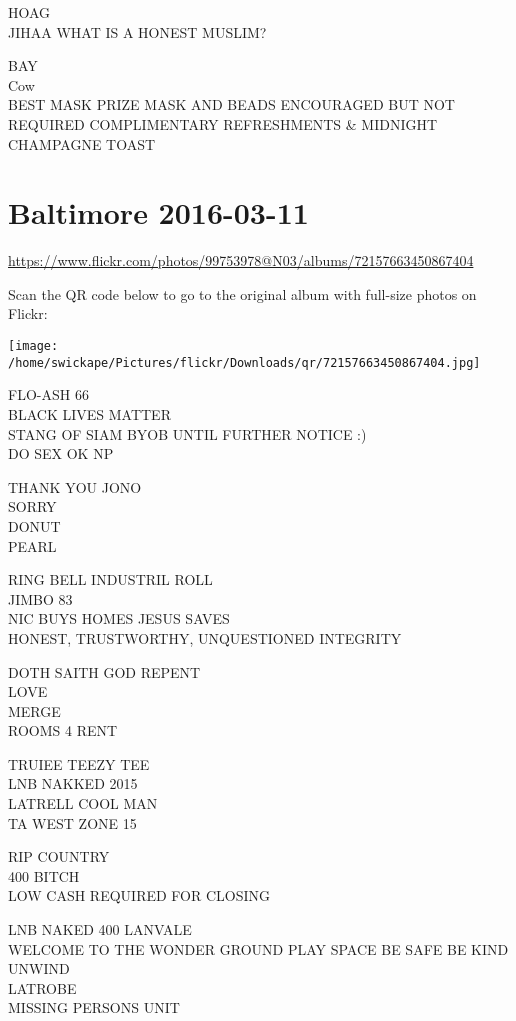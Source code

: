 \documentclass[10pt,letterpaper]{article}
\begin{document}
HOAG\\
JIHAA WHAT IS A HONEST MUSLIM?

BAY\\
Cow\\
BEST MASK PRIZE MASK AND BEADS ENCOURAGED BUT NOT REQUIRED COMPLIMENTARY REFRESHMENTS \& MIDNIGHT CHAMPAGNE TOAST


\section*{Baltimore 2016-03-11}

\url{https://www.flickr.com/photos/99753978@N03/albums/72157663450867404}

Scan the QR code below to go to the original album with full-size photos on Flickr:

\texttt{[image: /home/swickape/Pictures/flickr/Downloads/qr/72157663450867404.jpg]}


FLO{-}ASH 66\\
BLACK LIVES MATTER\\
STANG OF SIAM BYOB UNTIL FURTHER NOTICE :)\\
DO SEX OK NP

THANK YOU JONO\\
SORRY\\
DONUT\\
PEARL

RING BELL INDUSTRIL ROLL\\
JIMBO 83\\
NIC BUYS HOMES JESUS SAVES\\
HONEST, TRUSTWORTHY, UNQUESTIONED INTEGRITY

DOTH SAITH GOD REPENT\\
LOVE\\
MERGE\\
ROOMS 4 RENT

TRUIEE TEEZY TEE\\
LNB NAKKED 2015\\
LATRELL COOL MAN\\
TA WEST ZONE 15

RIP COUNTRY\\
400 BITCH\\
LOW CASH REQUIRED FOR CLOSING

LNB NAKED 400 LANVALE\\
WELCOME TO THE WONDER GROUND PLAY SPACE BE SAFE BE KIND UNWIND\\
LATROBE\\
MISSING PERSONS UNIT
\end{document}
